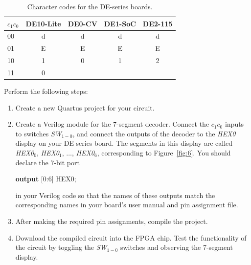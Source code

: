 \documentclass[epsfig,10pt,fullpage]{article}
\begin{document}
\begin{table}[H]
	\begin{center}
	\begin{tabular}{l | c | c | c | c}
	$c_1 c_0$ & DE10-Lite & DE0-CV & DE1-SoC & DE2-115 \\
	\hline
	{\rule[0mm]{0mm}{5mm}\hspace{0.75 mm} 00} & d & d & d & d \\
	\hspace{0.75 mm}
	01 & E & E & E & E \\
	\hspace{0.75 mm}
	10 & 1 & 0 & 1 & 2 \\
	\hspace{0.75 mm}
	11 & 0 & & & \\
	\end{tabular}
	\caption{Character codes for the DE-series boards.}
	\label{tab:codes}
	\end{center}
\end{table}

Perform the following steps:

\begin{enumerate}
\item Create a new Quartus project for your circuit.
\item Create a Verilog module for the 7-segment decoder. Connect the $c_1 c_0$ inputs
to switches {\it SW}$_{1-0}$, and connect the outputs of the decoder to the {\it HEX0} 
display on your DE-series board. The segments in this display are called 
{\it HEX0}$_0$, {\it HEX0}$_1$, $\ldots$, {\it HEX0}$_6$, corresponding to  Figure~\ref{fig:6}.
You should declare the 7-bit port 

\begin{center}
\begin{minipage}[t]{12.5 cm}
\begin{tabbing}
{\bf output} [0:6] HEX0;
\end{tabbing}
\end{minipage}
\end{center}

in your Verilog code so that the
names of these outputs match the corresponding names in your board's user manual and pin assignment file.
\item After making the required pin assignments, compile the project.
\item Download the compiled circuit into the FPGA chip. Test the functionality of the 
circuit by toggling the {\it SW}$_{1-0}$ switches and observing the 7-segment display.
\end{enumerate}
\end{document}
